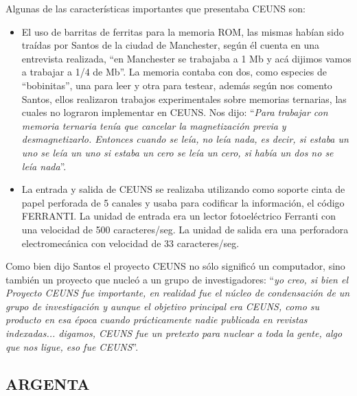 \documentclass[%
 	final,
%
	notitlepage,
	narroweqnarray,
	inline,
 	twoside,
	]{ieee}
\begin{document}
Algunas de las caracter\'isticas importantes que presentaba CEUNS son:\\

\begin{itemize}

\item El uso de barritas de ferritas para la memoria ROM, las mismas hab\'ian sido tra\'idas por Santos de la ciudad de Manchester, seg\'un \'el cuenta en una entrevista realizada, ``en Manchester se trabajaba a 1 Mb y ac\'a dijimos vamos a trabajar a 1/4 de Mb''. La memoria contaba con dos, como especies de ``bobinitas'', una para leer y otra para testear, adem\'as seg\'un nos comento Santos, ellos realizaron trabajos experimentales sobre memorias ternarias, las cuales no lograron implementar en CEUNS. Nos dijo: ``\textit{Para trabajar con memoria ternaria ten\'ia que cancelar la magnetizaci\'on previa y desmagnetizarlo. Entonces cuando se le\'ia, no le\'ia nada, es decir, si estaba un uno se le\'ia un uno si estaba un cero se le\'ia un cero, si hab\'ia un dos no se le\'ia nada}''.\\

\item La entrada y salida de CEUNS se realizaba utilizando como soporte cinta de papel perforada de 5 canales y usaba para codificar la informaci\'on, el c\'odigo FERRANTI. La unidad de entrada era un lector fotoel\'ectrico Ferranti con una velocidad de 500 caracteres/seg. La unidad de salida era una perforadora electromec\'anica con velocidad de 33 caracteres/seg.\\

\end{itemize}

Como bien dijo Santos el proyecto CEUNS no s\'olo signific\'o un computador, sino tambi\'en un proyecto que nucle\'o a un grupo de investigadores:
``\textit{yo creo, si bien el Proyecto CEUNS fue importante, en realidad fue el n\'ucleo de condensaci\'on de un grupo de investigaci\'on y aunque el objetivo principal era CEUNS, como su producto en esa \'epoca cuando pr\'acticamente nadie publicada en revistas indexadas... digamos, CEUNS fue un pretexto para nuclear a toda la gente, algo que nos ligue, eso fue CEUNS}''.

\subsection*{ARGENTA}
\end{document}
